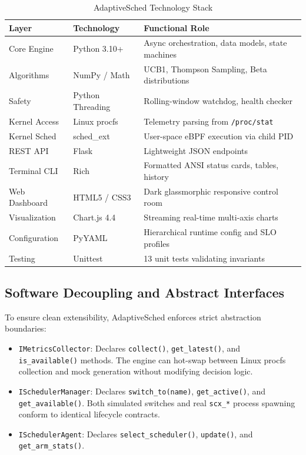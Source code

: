 \documentclass[journal]{IEEEtran}
\begin{document}
\begin{table}[H]
\centering
\small
\caption{AdaptiveSched Technology Stack}
\label{tab:techstack}
\begin{tabular}{p{1.7cm} p{2.1cm} p{3.9cm}}
\toprule
\textbf{Layer} & \textbf{Technology} & \textbf{Functional Role} \\
\midrule
Core Engine & Python 3.10+ & Async orchestration, data models, state machines \\
Algorithms & NumPy / Math & UCB1, Thompson Sampling, Beta distributions \\
Safety & Python Threading & Rolling-window watchdog, health checker \\
Kernel Access & Linux procfs & Telemetry parsing from \texttt{/proc/stat} \\
Kernel Sched & sched\_ext & User-space eBPF execution via child PID \\
REST API & Flask & Lightweight JSON endpoints \\
Terminal CLI & Rich & Formatted ANSI status cards, tables, history \\
Web Dashboard & HTML5 / CSS3 & Dark glassmorphic responsive control room \\
Visualization & Chart.js 4.4 & Streaming real-time multi-axis charts \\
Configuration & PyYAML & Hierarchical runtime config and SLO profiles \\
Testing & Unittest & 13 unit tests validating invariants \\
\bottomrule
\end{tabular}
\end{table}

\subsection{Software Decoupling and Abstract Interfaces}
To ensure clean extensibility, AdaptiveSched enforces strict abstraction boundaries:
\begin{itemize}
    \item \texttt{IMetricsCollector}: Declares \texttt{collect()}, \texttt{get\_latest()}, and \texttt{is\_available()} methods. The engine can hot-swap between Linux procfs collection and mock generation without modifying decision logic.
    \item \texttt{ISchedulerManager}: Declares \texttt{switch\_to(name)}, \texttt{get\_active()}, and \texttt{get\_available()}. Both simulated switches and real \texttt{scx\_*} process spawning conform to identical lifecycle contracts.
    \item \texttt{ISchedulerAgent}: Declares \texttt{select\_scheduler()}, \texttt{update()}, and \texttt{get\_arm\_stats()}.
\end{itemize}
\end{document}
